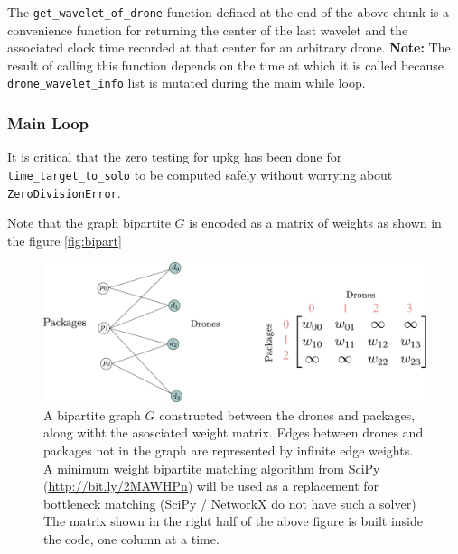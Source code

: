 \documentclass[10pt, english, oneside]{report}
\begin{document}

 The \verb|get_wavelet_of_drone| function defined at the end of the above chunk is a convenience function 
 for returning the center of the last wavelet and the associated clock time recorded at that center
 for an arbitrary drone.  \textbf{Note:} The result of calling this function depends on the time at which it 
 is called because \verb|drone_wavelet_info| list is mutated during the main while loop.

\subsubsection{Main Loop}
\label{ssec:mainloopmatchmove}




It is critical that the zero testing for upkg has 
been done for \verb|time_target_to_solo| to be computed safely 
without worrying about \verb|ZeroDivisionError|.

Note that the graph bipartite $G$ is encoded as a matrix of weights as shown in the 
figure \autoref{fig:bipart}

\begin{figure}[H]
\centering
\includegraphics[width=17cm]{docs/bipartgraph_demo.pdf}
\caption{A bipartite graph $G$ constructed between the drones 
and packages, along witht the asosciated weight matrix. Edges between
drones and packages not in the graph are represented by infinite edge 
weights. A minimum weight bipartite matching algorithm from SciPy (\url{http://bit.ly/2MAWHPn}) will 
be used as a replacement for bottleneck matching (SciPy / NetworkX do not 
have such a solver) The matrix shown in the right half of the above figure is 
built inside the code, one column at a time. }
\end{figure}
\label{fig:bipart}
\end{document}
